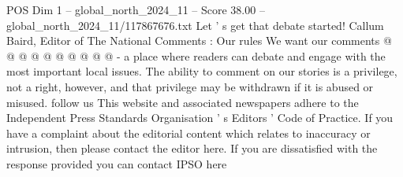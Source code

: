 \begin{textsample}{POS Dim 1 – global\_north\_2024\_11 – Score 38.00 – global\_north\_2024\_11/117867676.txt}
Let ' s get that debate started!
Callum Baird, Editor of The National Comments : Our rules We want our comments @ @ @ @ @ @ @ @ @ @ - a place where readers can debate and engage with the most important local issues.
The ability to comment on our stories is a privilege, not a right, however, and that privilege may be withdrawn if it is abused or misused. follow us This website and associated newspapers adhere to the Independent Press Standards Organisation ' s Editors ' Code of Practice.
If you have a complaint about the editorial content which relates to inaccuracy or intrusion, then please contact the editor here.
If you are dissatisfied with the response provided you can contact IPSO here

\end{textsample}

